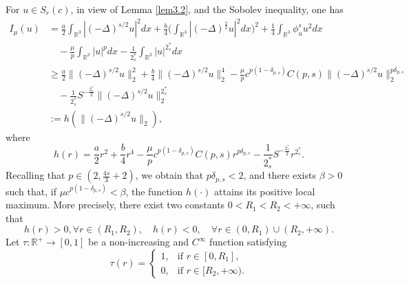 \documentclass[11pt]{article}
\numberwithin{equation}{section}
\begin{document}
For $u\in S_{r}(c)$, in view of Lemma \ref{lem3.2}, and the Sobolev inequality, one has
\begin{align*}
I_\mu(u)
&= \frac{a}{2}\int_{\mathbb{R}^3}|(-\Delta)^{s/2}u|^2dx
 +\frac{b}{4}\Big(\int_{\mathbb{R}^3}|(-\Delta)^
{\frac{s}{2}}u|^2dx\Big)^2
 +\frac{1}{4}\int_{\mathbb{R}^3}\phi^s_u u^2dx\\
&\quad -\frac{\mu}{p}\int_{\mathbb{R}^3}|u|^pdx
 -\frac{1}{2^*_s}\int_{\mathbb{R}^3}|u|^{2^*_s}dx\\
&\geq  \frac{a}{2}\|(-\Delta)^{s/2}u\|^2_2+\frac{b}{4}\|(-\Delta)^{s/2}u\|^4_2
 -\frac{\mu}{p}c^{p(1-\delta_{p,s})}C({p,s})\|(-\Delta)^{s/2}u\|^{p\delta_{p,s}}_2\\
&\quad -\frac{1}{2^*_s}S^{-\frac{2^*_s}{2}}\|(-\Delta)^{s/2}u\|^{2^*_s}_2\\
&:= h(\|(-\Delta)^{s/2}u\|_2),
\end{align*}
where
$$
h(r)=\frac{a}{2}r^2+\frac{b}{4}r^4
-\frac{\mu}{p}c^{p(1-\delta_{p,s})}C({p,s})r^{p\delta_{p,s}}
-\frac{1}{2^*_s}S^{-\frac{2^*_s}{2}}r^{2^*_s}.
$$
Recalling that $p\in(2,\frac{4s}{3}+2)$, we obtain that $p\delta_{p,s}<2$, and there
exists $\beta>0$ such that, if $\mu c^{p(1-\delta_{p,s})}<\beta$, the function
$h(\cdot)$ attains its positive local maximum. More precisely, there exist two
constants $0<R_1<R_2<+\infty$, such that
$$
h(r)>0, \forall r\in(R_1, R_2),\quad
 h(r)<0, \quad \forall r\in(0,R_1)\cup(R_2, +\infty).
$$
Let $\tau: \mathbb{R}^+\to [0,1]$ be a non-increasing and $C^\infty$ function
satisfying
\[
\tau(r) =
\begin{cases}
1, & \text{if } r\in [0, R_1], \\
0, & \text{if } r\in [R_2, +\infty).
\end{cases}
\]
\end{document}
